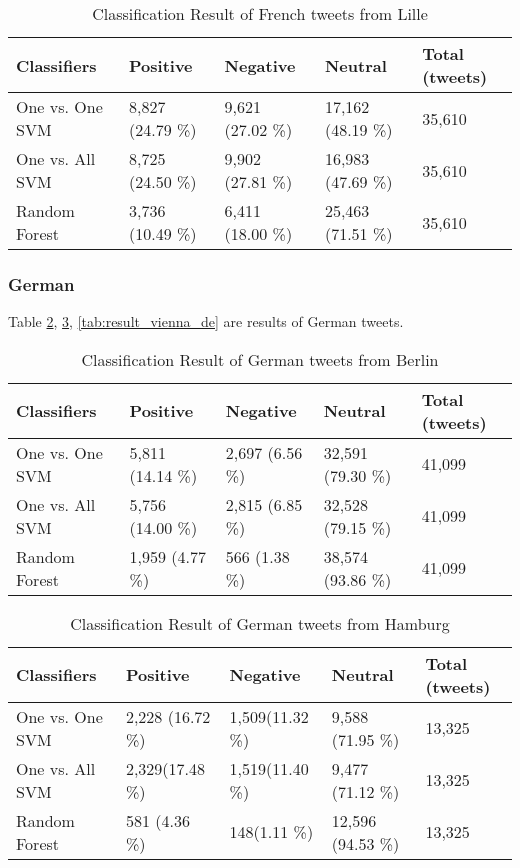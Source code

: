 \begin{comment}
London
N.Y or San Francisco

\end{comment}

\begin{table}[ht]
	\caption{Classification Result of French tweets from Lille}
	\begin{tabular}{|l|p{1.8cm}|p{1.8cm}|p{1.8cm}|p{1.8cm}|} \hline
	Classifiers & Positive & Negative & Neutral & Total (tweets)\\ \hline
	
	One vs. One SVM & 8,827 (24.79 \%)& 9,621 (27.02 \%)& 17,162 (48.19 \%)& 35,610 \\ \hline
	One vs. All SVM & 8,725 (24.50 \%)& 9,902 (27.81 \%)& 16,983 (47.69 \%)& 35,610 \\ \hline
	Random Forest   & 3,736 (10.49 \%)& 6,411 (18.00 \%)& 25,463 (71.51 \%)& 35,610 \\ \hline
	\end{tabular}
	\label{tab:result_lille_fr}
\end{table}


\clearpage
\subsubsection{German}
Table \ref{tab:result_berlin_de}, \ref{tab:result_hamburg_de}, \ref{tab:result_vienna_de} are results of German tweets.
\begin{table}[ht]
	\caption{Classification Result of German tweets from Berlin}
	\begin{tabular}{|l|p{1.8cm}|p{1.8cm}|p{1.8cm}|p{1.8cm}|} \hline
	Classifiers & Positive & Negative & Neutral & Total (tweets)\\ \hline
One vs. One SVM & 5,811 (14.14 \%) & 2,697 (6.56 \%)  & 32,591 (79.30 \%)& 41,099\\ \hline
One vs. All SVM & 5,756 (14.00 \%) & 2,815 (6.85 \%) & 32,528 (79.15 \%) & 41,099 \\ \hline
Random Forest   & 1,959 (4.77 \%) & 566 (1.38 \%) & 38,574 (93.86 \%) & 41,099 \\ \hline
	\end{tabular}
	\label{tab:result_berlin_de}
\end{table}


\begin{table}[ht]
	\caption{Classification Result of German tweets from Hamburg}
	\begin{tabular}{|l|p{1.8cm}|p{1.8cm}|p{1.8cm}|p{1.8cm}|} \hline
	Classifiers & Positive & Negative & Neutral & Total (tweets)\\ \hline
One vs. One SVM & 2,228 (16.72 \%)& 1,509(11.32 \%) & 9,588 (71.95 \%) & 13,325 \\ \hline
One vs. All SVM & 2,329(17.48 \%) & 1,519(11.40 \%) & 9,477 (71.12 \%) & 13,325\\ \hline
Random Forest   & 581 (4.36 \%) & 148(1.11 \%)  & 12,596 (94.53 \%) & 13,325\\ \hline
	\end{tabular}
	\label{tab:result_hamburg_de}
\end{table}


